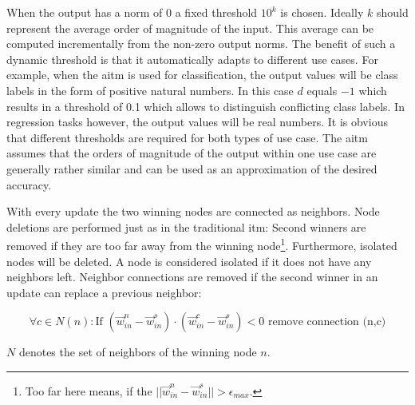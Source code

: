 When the output has a norm of $0$ a fixed threshold $10^k$ is chosen. Ideally $k$ should represent the average order of magnitude of the input. This average can be computed incrementally from the non-zero output norms. The benefit of such a dynamic threshold is that it automatically adapts to different use cases. For example, when the \gls{aitm} is used for classification, the output values will be class labels in the form of positive natural numbers. In this case $d$ equals $-1$ which results in a threshold of 0.1 which allows to distinguish conflicting class labels.
In regression tasks however, the output values will be real numbers. It is obvious that different thresholds are required for both types of use case. The \gls{aitm} assumes that the orders of magnitude of the output within one use case are generally rather similar and can be used as an approximation of the desired accuracy.


With every update the two winning nodes are connected as neighbors. Node deletions are performed just as in the traditional \gls{itm}: Second winners are removed if they are too far away from the winning node\footnote{Too far here means, if the $||\vec{w}^n_{in} - \vec{w}^s_{in}|| > \epsilon_{max}$. }. Furthermore, isolated nodes will be deleted. A node is considered isolated if it does not have any neighbors left. Neighbor connections are removed if the second winner in an update can replace a previous neighbor:

\begin{equation}
\forall c \in N(n): \text{If~} (\vec{w}^n_{in}-\vec{w}^s_{in}) \cdot (\vec{w}^c_{in}-\vec{w}^s_{in}) < 0 \text{~remove connection (n,c)}
\end{equation}

$N$ denotes the set of neighbors of the winning node $n$.

